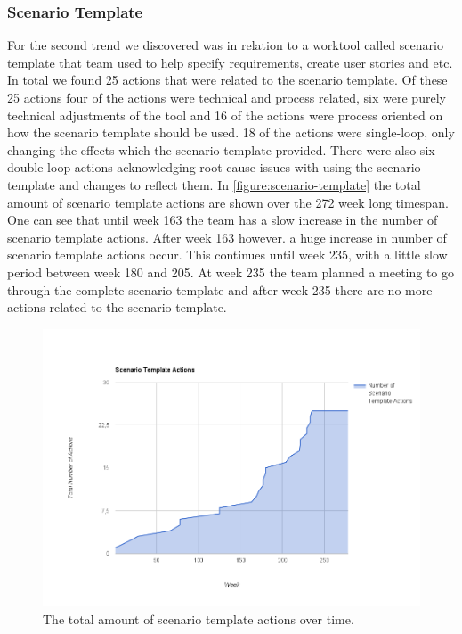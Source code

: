 \subsubsection{Scenario Template}\label{results-ca-scenario-template}
For the second trend we discovered was in relation to a worktool called scenario template that team used to help specify requirements, create user stories and etc. In total we found 25 actions that were related to the scenario template. Of these 25 actions four of the actions were technical and process related, six were purely technical adjustments of the tool and 16 of the actions were process oriented on how the scenario template should be used. 18 of the actions were single-loop, only changing the effects which the scenario template provided. There were also six double-loop actions acknowledging root-cause issues with using the scenario-template and changes to reflect them. 
In \autoref{figure:scenario-template} the total amount of scenario template actions are shown over the 272 week long timespan. One can see that until week 163 the team has a slow increase in the number of scenario template actions. After week 163 however. a huge increase in number of scenario template actions occur. This continues until week 235, with a little slow period between week 180 and 205. At week 235 the team planned a meeting to go through the complete scenario template and after week 235 there are no more actions related to the scenario template. 

\begin{figure}[!h]
	\centering
	\includegraphics[width=\textwidth, keepaspectratio]{figures/Scenario-tpl.png}
	\caption{The total amount of scenario template actions over time.}
	\label{figure:scenario-template}
\end{figure}

